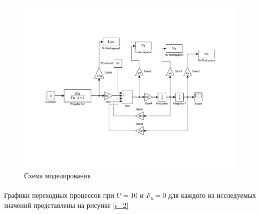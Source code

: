 \documentclass[a4paper,12pt]{article}
\begin{document}
	\begin{figure}[h]
		\renewcommand{\figurename}{Рисунок}
		\centering
		\includegraphics[width=6in]{Labb11.pdf}
		\caption{Схема моделирования}
		\label{s_1}
	\end{figure}
	\paragraph {} Графики переходных процессов при $U=10$ и $F_{\text{в}}=0$ для каждого из исследуемых значений представлены на рисунке \ref{s_2}\\
	
\end{document}
